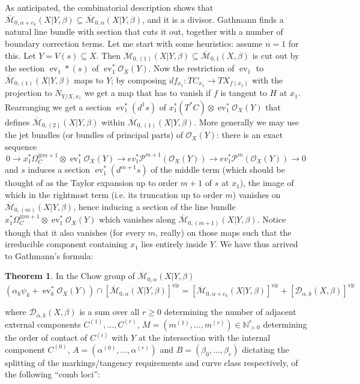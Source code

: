 \documentclass[11pt]{amsart}
\newcommand{\M}[4]{\overline{\mathcal{M}}_{#1,#2}(#3,#4)}
\newcommand{\N}{\mathbb{N}}
\newcommand{\OO}{\mathcal{O}}
\renewcommand{\to}{\rightarrow}
\newcommand{\virt}[1]{[#1]^{\operatorname{vir}}}
\newcommand{\ev}{\operatorname{ev}}
\theoremstyle{definition}
\newtheorem{thm}{Theorem}[section]
\theoremstyle{definition}
\begin{document}
As anticipated, the combinatorial description shows that $\M{0}{\alpha+e_k}{X|Y}{\beta}\subseteq \M{0}{\alpha}{X|Y}{\beta}$, and it is a divisor. Gathmann finds a natural line bundle with section that cuts it out, together with a number of boundary correction terms. Let me start with some heuristics: assume $n=1$ for this. Let $Y=V(s)\subseteq X$. Then $\M{0}{(1)}{X|Y}{\beta}\subseteq \M{0}{1}{X}{\beta}$ is cut out by the section $\ev_1*(s)$ of $\ev_1^*\OO_X(Y)$. Now the restriction of $\ev_1$ to $\M{0}{(1)}{X|Y}{\beta}$ maps to $Y$; by composing $df_{x_1}\colon TC_{x_1}\to TX_{f(x_1)}$ with the projection to $N_{Y/X,x_1}$ we get a map that has to vanish if $f$ is tangent to $H$ at $x_1$. Rearranging we get a section $\ev_1^*(d^1s)$ of $x_1^*(T^*C)\otimes\ev_1^*\OO_X(Y)$ that defines $\M{0}{(2)}{X|Y}{\beta}$ within $\M{0}{(1)}{X|Y}{\beta}$. More generally we may use the jet bundles (or bundles of principal parts) of $\OO_X(Y)$: there is an exact sequence
\[ 0\to x_1^*\Omega_{C}^{\otimes m+1}\otimes\ev_1^*\OO_X(Y)\to ev_1^*\mathcal P^{m+1}(\OO_X(Y))\to ev_1^*\mathcal P^{m}(\OO_X(Y))\to 0\]
and $s$ induces a section $\ev_1^*(d^{m+1}s)$ of the middle term (which should be thought of as the Taylor expansion up to order $m+1$ of $s$ at $x_1$), the image of which in the rightmost term (i.e. its truncation up to order $m$) vanishes on $\M{0}{(m)}{X|Y}{\beta}$, hence inducing a section of the line bundle $x_1^*\Omega_{C}^{\otimes m+1}\otimes\ev_1^*\OO_X(Y)$ which vanishes along $\M{0}{(m+1)}{X|Y}{\beta}$. Notice though that it also vanishes (for every $m$, really) on those maps such that the irreducible component containing $x_1$ lies entirely inside $Y$. We have thus arrived to Gathmann's formula:
\begin{thm}\cite[Theorem 2.6]{Ga}\label{thm:Gathmann_formula} In the Chow group of $\M{0}{\alpha}{X|Y}{\beta}$
 \begin{equation*} (\alpha_k \psi_k + \ev_k^* \OO_X(Y)) \cap \virt{\M{0}{\alpha}{X|Y}{\beta}} = \virt{\M{0}{\alpha+e_k}{X|Y}{\beta}} + \virt{\mathcal{D}_{\alpha,k}(X,\beta)} \end{equation*}
\end{thm}
where $\mathcal{D}_{\alpha,k}(X,\beta)$ is a sum over all $r\geq 0$ determining the number of adjacent external components $C^{(1)},\ldots,C^{(r)}$, $M=(m^{(1)},\ldots,m^{(r)})\in \N^r_{>0}$ determining the order of contact of $C^{(i)}$ with $Y$ at the intersection with the internal component $C^{(0)}$, $A=(\alpha^{(0)},\ldots,\alpha^{(r)})$ and $B=(\beta_0,\ldots,\beta_r)$ dictating the splitting of the markings/tangency requirements and curve class respectively, of the following ``comb loci'':
\end{document}
